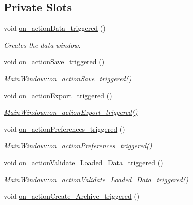 \subsection*{Private Slots}
\begin{DoxyCompactItemize}
\item 
void \hyperlink{class_main_window_a3ca9d4a4b5afe31afaff0d89a84c68fb}{on\+\_\+action\+Data\+\_\+triggered} ()
\begin{DoxyCompactList}\small\item\em Creates the data window. \end{DoxyCompactList}\item 
void \hyperlink{class_main_window_ad550c61cfa05c7e528dedc6cf636ed10}{on\+\_\+action\+Save\+\_\+triggered} ()
\begin{DoxyCompactList}\small\item\em \hyperlink{class_main_window_ad550c61cfa05c7e528dedc6cf636ed10}{Main\+Window\+::on\+\_\+action\+Save\+\_\+triggered()} \end{DoxyCompactList}\item 
void \hyperlink{class_main_window_a7df050ed9d3ca5f73a3ed852b35fc736}{on\+\_\+action\+Export\+\_\+triggered} ()
\begin{DoxyCompactList}\small\item\em \hyperlink{class_main_window_a7df050ed9d3ca5f73a3ed852b35fc736}{Main\+Window\+::on\+\_\+action\+Export\+\_\+triggered()} \end{DoxyCompactList}\item 
void \hyperlink{class_main_window_a2e63d199e37300ac181f39c3a7a7d78b}{on\+\_\+action\+Preferences\+\_\+triggered} ()
\begin{DoxyCompactList}\small\item\em \hyperlink{class_main_window_a2e63d199e37300ac181f39c3a7a7d78b}{Main\+Window\+::on\+\_\+action\+Preferences\+\_\+triggered()} \end{DoxyCompactList}\item 
void \hyperlink{class_main_window_ab1627fe6865e74d1e6364a0183abdf5c}{on\+\_\+action\+Validate\+\_\+\+Loaded\+\_\+\+Data\+\_\+triggered} ()
\begin{DoxyCompactList}\small\item\em \hyperlink{class_main_window_ab1627fe6865e74d1e6364a0183abdf5c}{Main\+Window\+::on\+\_\+action\+Validate\+\_\+\+Loaded\+\_\+\+Data\+\_\+triggered()} \end{DoxyCompactList}\item 
void \hyperlink{class_main_window_a6ac0bcf0b051abe049c84075e0a5d13a}{on\+\_\+action\+Create\+\_\+\+Archive\+\_\+triggered} ()

\end{DoxyCompactItemize}
